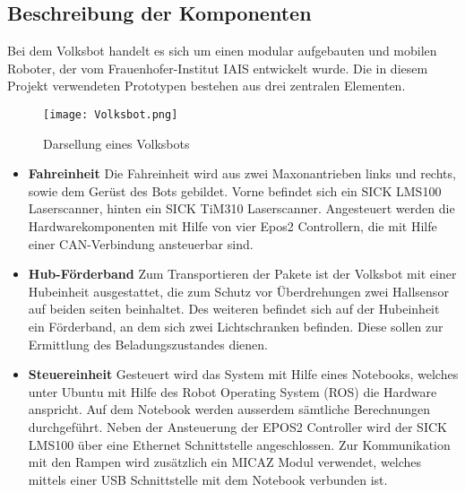 \subsection{Beschreibung der Komponenten}

Bei dem Volksbot handelt es sich um einen modular aufgebauten und mobilen Roboter, der vom Frauenhofer-Institut IAIS entwickelt wurde. Die in diesem Projekt verwendeten Prototypen bestehen aus drei zentralen Elementen. 

	\begin{figure}[h!]
		\centering
			\texttt{[image: Volksbot.png]}
			\caption{Darsellung eines Volksbots}
			\label{Volksbot}
	\end{figure}	

\begin{itemize}

\item \textbf{Fahreinheit}
Die Fahreinheit wird aus zwei Maxonantrieben links und rechts, sowie dem Gerüst des Bots gebildet. Vorne befindet sich ein SICK LMS100 Laserscanner,  hinten ein SICK TiM310 Laserscanner. Angesteuert werden die Hardwarekomponenten mit Hilfe von vier Epos2 Controllern, die mit Hilfe einer CAN-Verbindung ansteuerbar sind. 

\item \textbf{Hub-Förderband}
Zum Transportieren der Pakete ist der Volksbot mit einer Hubeinheit ausgestattet, die zum Schutz vor Überdrehungen zwei Hallsensor auf beiden seiten beinhaltet. Des weiteren befindet sich auf der Hubeinheit ein Förderband, an dem sich zwei Lichtschranken befinden. Diese sollen zur Ermittlung des Beladungszustandes dienen. 

\item \textbf{Steuereinheit}
Gesteuert wird das System mit Hilfe eines Notebooks, welches unter Ubuntu mit Hilfe des Robot Operating System (ROS) die Hardware anspricht. Auf dem Notebook werden ausserdem sämtliche 
Berechnungen durchgeführt. Neben der Ansteuerung der EPOS2 Controller wird der SICK LMS100 über eine Ethernet Schnittstelle angeschlossen. Zur Kommunikation mit den Rampen wird zusätzlich ein MICAZ Modul verwendet, welches mittels einer USB Schnittstelle mit dem Notebook verbunden ist.

\end{itemize}